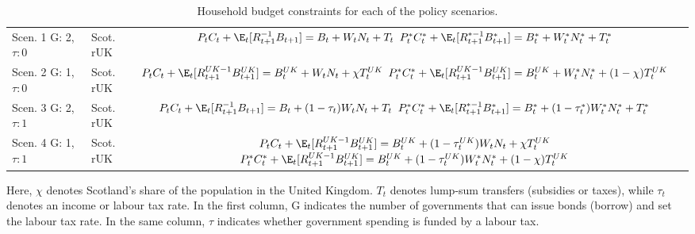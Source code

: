 \begin{table}[H]
 \centering
 \renewcommand{\arraystretch}{2}
 \begin{tabular}{l|l|c}
 \makecell{Scen. 1 \\ G: 2, $\tau: 0$} & \makecell{Scot. \\ rUK } & 
 \makecell{
 $P_t C_t + \E_t [{R^{-1}_{t+1}}B_{t+1}] = B_t + W_t N_t + T_t$ \\
 $P^*_t C^*_t + \E_t [{R^{*-1}_{t+1}}B^*_{t+1}] = B^*_t + W^*_t N^*_t + T^*_t$
 } \\ 
 \makecell{Scen. 2 \\ G: 1, $\tau: 0$} & \makecell{Scot. \\ rUK } & 
 \makecell{
 $P_t C_t + \E_t [{R^{UK-1}_{t+1}}B^{UK}_{t+1}] = B^{UK}_t + W_t N_t + \chi T^{UK}_t$ \\
 $P^*_t C^*_t + \E_t [{R^{UK-1}_{t+1}}B^{UK}_{t+1}] = B^{UK}_t + W^*_t N^*_t + (1-\chi)T^{UK}_t$
 } \\ 
 \makecell{Scen. 3 \\ G: 2, $\tau: 1$} & \makecell{Scot. \\ rUK } & 
 \makecell{
 $P_t C_t + \E_t [{R^{-1}_{t+1}}B_{t+1}] = B_t + (1-\tau_t)W_t N_t + T_t$ \\
 $P^*_t C^*_t + \E_t [{R^{*-1}_{t+1}}B^*_{t+1}] = B^*_t + (1-\tau^*_t)W^*_t N^*_t + T^*_t$ 
 } \\
 \makecell{Scen. 4 \\ G: 1, $\tau: 1$} & \makecell{Scot. \\ rUK } & 
 \makecell{
 $P_t C_t + \E_t [{R^{UK-1}_{t+1}}B^{UK}_{t+1}] = B^{UK}_t + (1-\tau^{UK}_t)W_t N_t + \chi T^{UK}_t$ \\
 $P^*_t C^*_t + \E_t [{R^{UK-1}_{t+1}}B^{UK}_{t+1}] = B^{UK}_t + (1-\tau^{UK}_t)W^*_t N^*_t + (1-\chi)T^{UK}_t$
 } 
 \end{tabular}
 \caption{Household budget constraints for each of the policy scenarios.}
\end{table}
Here, $\chi$ denotes Scotland's share of the population in the United Kingdom. $T_t$ denotes lump-sum transfers (subsidies or taxes), while $\tau_t$ denotes an income or labour tax rate. In the first column, G indicates the number of governments that can issue bonds (borrow) and set the labour tax rate. In the same column, $\tau$ indicates whether government spending is funded by a labour tax.

